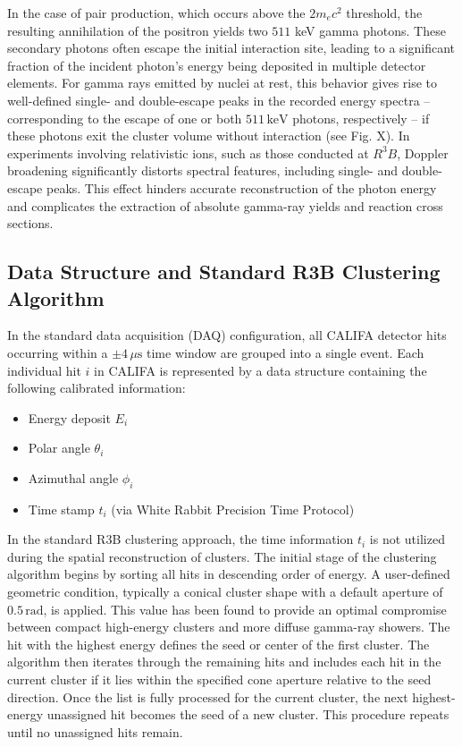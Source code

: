 \documentclass[final,5p,times,twocolumn]{elsarticle}
\begin{document}
In the case of pair production, which occurs above the $2m_ec^2$ threshold, the resulting annihilation of the positron yields two $511$ keV gamma photons. These secondary photons often escape the initial interaction site, leading to a significant fraction of the incident photon’s energy being deposited in multiple detector elements.\newline
For gamma rays emitted by nuclei at rest, this behavior gives rise to well-defined single- and double-escape peaks in the recorded energy spectra -- corresponding to the escape of one or both $511\,\mathrm{keV}$ photons, respectively -- if these photons exit the cluster volume without interaction (see Fig. X).\newline
In experiments involving relativistic ions, such as those conducted at $R^3B$, Doppler broadening significantly distorts spectral features, including single- and double-escape peaks. This effect hinders accurate reconstruction of the photon energy and complicates the extraction of absolute gamma-ray yields and reaction cross sections.

\subsection{Data Structure and Standard R3B Clustering Algorithm}\label{s_sec:r3b_clustering}
In the standard data acquisition (DAQ) configuration, all CALIFA detector hits occurring within a $\pm 4\,\mu\mathrm{s}$ time window are grouped into a single event. Each individual hit $i$ in CALIFA is represented by a data structure containing the following calibrated information:
\begin{itemize}
    \item Energy deposit $E_i$
    \item Polar angle $\theta_i$
    \item Azimuthal angle $\phi_i$
    \item Time stamp $t_i$ (via White Rabbit  Precision Time Protocol\cite{lipinski2011white})
\end{itemize}
In the standard R3B clustering approach, the time information $t_i$ is not utilized during the spatial reconstruction of clusters.\newline
The initial stage of the clustering algorithm begins by sorting all hits in descending order of energy. A user-defined geometric condition, typically a conical cluster shape with a default aperture of $0.5\,\mathrm{rad}$, is applied. This value has been found to provide an optimal compromise between compact high-energy clusters and more diffuse gamma-ray showers.\newline
The hit with the highest energy defines the seed or center of the first cluster. The algorithm then iterates through the remaining hits and includes each hit in the current cluster if it lies within the specified cone aperture relative to the seed direction. Once the list is fully processed for the current cluster, the next highest-energy unassigned hit becomes the seed of a new cluster. This procedure repeats until no unassigned hits remain.\newline
\end{document}
